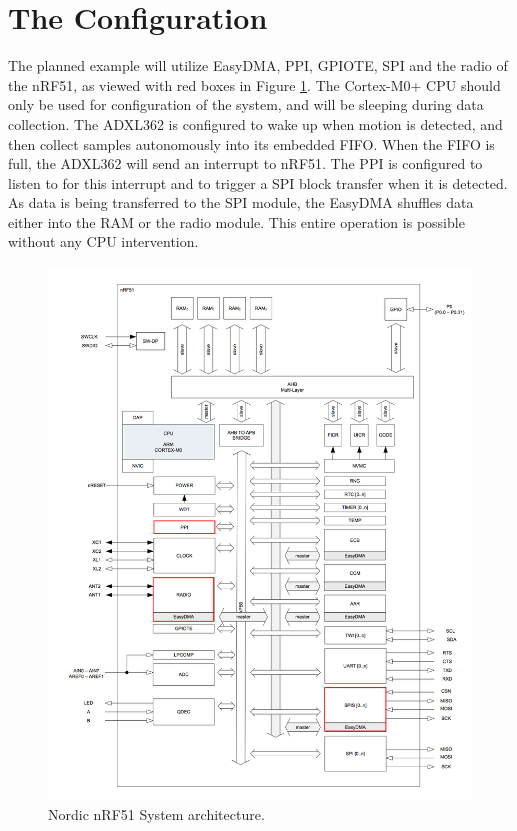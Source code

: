 \section{The Configuration}

The planned example will utilize EasyDMA, PPI, GPIOTE, SPI and the radio of the nRF51, as viewed with red boxes in Figure \ref{fig:accel_working_principle}. The Cortex-M0+ CPU should only be used for configuration of the system, and will be sleeping during data collection. The ADXL362 is configured to wake up when motion is detected, and then collect samples autonomously into its embedded FIFO. When the FIFO is full, the ADXL362 will send an interrupt to nRF51. The PPI is configured to listen to for this interrupt and to trigger a SPI block transfer when it is detected. As data is being transferred to the SPI module, the EasyDMA shuffles data either into the RAM or the radio module. This entire operation is possible without any CPU intervention.

\begin{figure}[h]
\centering
\includegraphics[scale=0.5]{fig/nrf51822_edit.png}
\caption{Nordic nRF51 System architecture. \cite{nRF51}}
\label{fig:accel_working_principle}
\end{figure}

